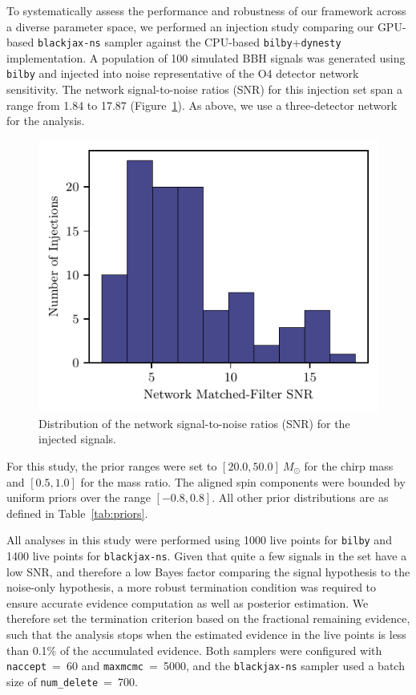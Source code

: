 \documentclass[fleqn,usenatbib]{mnras}
\begin{document}
To systematically assess the performance and robustness of our framework
across a diverse parameter space, we performed an injection study
comparing our GPU-based \texttt{blackjax-ns} sampler against the
CPU-based \texttt{bilby}+\texttt{dynesty} implementation. A population
of 100 simulated BBH signals was generated using \texttt{bilby} and
injected into noise representative of the O4 detector network
sensitivity. The network signal-to-noise ratios (SNR) for this
injection set span a range from 1.84 to 17.87 (Figure~\ref{fig:snr_dist}).
As above, we use a three-detector network for the analysis.

\begin{figure}
    \centering
    \includegraphics{figures/injection_snr_hist.pdf}
    \caption{Distribution of the network signal-to-noise ratios (SNR) for the injected signals.}
    \label{fig:snr_dist}
\end{figure}


For this study, the prior ranges were set to $[20.0, 50.0]~M_{\odot}$
for the chirp mass and $[0.5, 1.0]$ for the mass ratio. The aligned
spin components were bounded by uniform priors over the range
$[-0.8, 0.8]$. All other prior distributions are as defined in
Table~\ref{tab:priors}.

All analyses in this study were performed using 1000 live points for \texttt{bilby} and
1400 live points for \texttt{blackjax-ns}. Given that quite a few signals in the set have a low SNR, and therefore a
low Bayes factor comparing the signal hypothesis to the noise-only
hypothesis, a more robust termination condition was required to
ensure accurate evidence computation as well as posterior estimation.
We therefore set the termination criterion based on the fractional
remaining evidence, such that the analysis stops when the estimated
evidence in the live points is less than 0.1\% of the accumulated
evidence. Both samplers were configured with
\mbox{\texttt{naccept} = 60} and \mbox{\texttt{maxmcmc} = 5000}, and the \texttt{blackjax-ns}
sampler used a batch size of \mbox{\texttt{num\_delete} = 700}. 
\end{document}
